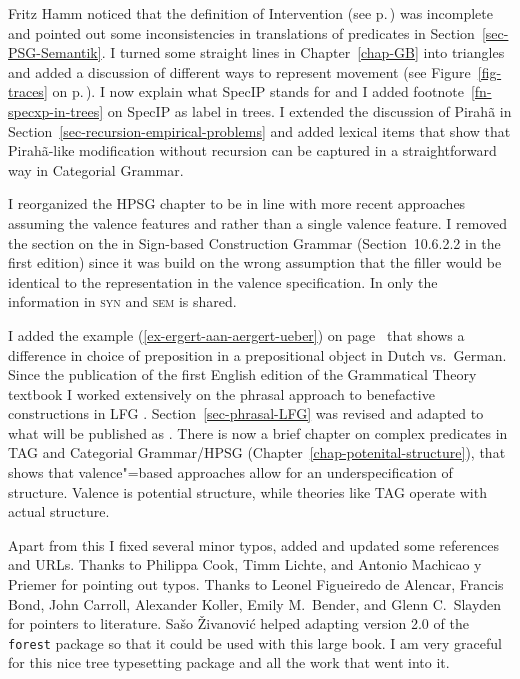Fritz Hamm noticed that the definition of Intervention (see p.\,\pageref{def-intervention}) was
incomplete and pointed out some inconsistencies in translations of predicates in
Section~\ref{sec-PSG-Semantik}. 
%
%
%
I turned some straight lines in Chapter~\ref{chap-GB} into triangles and added a discussion of
different ways to represent movement (see Figure~\ref{fig-traces} on p.\,\pageref{fig-traces}).
%
I now explain what SpecIP stands for and I added footnote~\ref{fn-specxp-in-trees} on SpecIP as label in trees.
%
%
I extended the discussion of Pirahã in Section~\ref{sec-recursion-empirical-problems} and added
lexical items that show that Pirahã-like modification without recursion can be captured in a
straightforward way in Categorial Grammar. 

I reorganized the HPSG chapter to be in line with more recent approaches assuming the valence
features \spr and \comps \citep{Sag97a,MuellerGermanic} rather than a single valence feature.
I removed the section on the \localf in Sign-based Construction Grammar (Section~10.6.2.2 in the
first edition) since it was build on the wrong assumption that the filler would be identical to the
representation in the valence specification. In \citet[]{Sag2012a} only the information in
\textsc{syn} and \textsc{sem} is shared. 

I added the example (\ref{ex-ergert-aan-aergert-ueber}) on
page~\pageref{ex-ergert-aan-aergert-ueber} that shows a difference in choice of preposition in a
prepositional object in Dutch vs.\ German. Since the publication of the first English edition of the
Grammatical Theory textbook I worked extensively on the phrasal approach to benefactive
constructions in LFG \citep*{AGT2014a}. Section~\ref{sec-phrasal-LFG} was
revised and adapted to what will be published as .
There is now a brief chapter on complex predicates in TAG
and Categorial Grammar/HPSG (Chapter~\ref{chap-potenital-structure}), that shows that valence"=based
approaches allow for an underspecification of structure. Valence is potential structure, while
theories like TAG operate with actual structure.  

Apart from this I fixed several minor typos, added and updated some references and URLs. Thanks to
Philippa Cook, Timm Lichte, and Antonio Machicao y Priemer for pointing out typos. Thanks to 
Leonel Figueiredo de Alencar,
Francis Bond,
John Carroll,
Alexander Koller,
Emily M.\ Bender,
and
Glenn C.\ Slayden
for pointers to literature.
%
Sašo Živanović helped adapting version 2.0 of
the \texttt{forest} package so that it could be used with this large book. I am very graceful for
this nice tree typesetting package and all the work that went into it.

